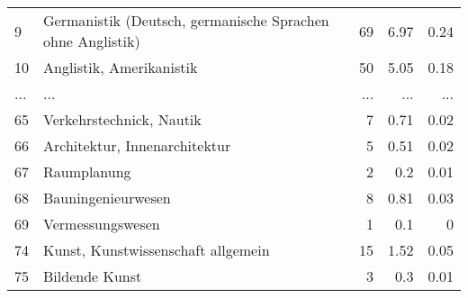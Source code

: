 \begin{longtable}{lXrrr}
        9 & \multicolumn{1}{X}{Germanistik (Deutsch, germanische Sprachen ohne Anglistik)} & %
          \num{69} &
          \num[round-mode=places,round-precision=2]{6.97} &
          \num[round-mode=places,round-precision=2]{0.24} \\
        10 & \multicolumn{1}{X}{Anglistik, Amerikanistik} & %
          \num{50} &
          \num[round-mode=places,round-precision=2]{5.05} &
          \num[round-mode=places,round-precision=2]{0.18} \\
       ... & ... & ... & ... & ... \\
        65 & \multicolumn{1}{X}{Verkehrstechnick, Nautik} & %
          \num{7} &
          \num[round-mode=places,round-precision=2]{0.71} &
          \num[round-mode=places,round-precision=2]{0.02} \\

        66 & \multicolumn{1}{X}{Architektur, Innenarchitektur} & %
          \num{5} &
          \num[round-mode=places,round-precision=2]{0.51} &
          \num[round-mode=places,round-precision=2]{0.02} \\

        67 & \multicolumn{1}{X}{Raumplanung} & %
          \num{2} &
          \num[round-mode=places,round-precision=2]{0.2} &
          \num[round-mode=places,round-precision=2]{0.01} \\

        68 & \multicolumn{1}{X}{Bauningenieurwesen} & %
          \num{8} &
          \num[round-mode=places,round-precision=2]{0.81} &
          \num[round-mode=places,round-precision=2]{0.03} \\

        69 & \multicolumn{1}{X}{Vermessungswesen} & %
          \num{1} &
          \num[round-mode=places,round-precision=2]{0.1} &
          \num[round-mode=places,round-precision=2]{0} \\

        74 & \multicolumn{1}{X}{Kunst, Kunstwissenschaft allgemein} & %
          \num{15} &
          \num[round-mode=places,round-precision=2]{1.52} &
          \num[round-mode=places,round-precision=2]{0.05} \\

        75 & \multicolumn{1}{X}{Bildende Kunst} & %
          \num{3} &
          \num[round-mode=places,round-precision=2]{0.3} &
          \num[round-mode=places,round-precision=2]{0.01} \\


\end{longtable}
